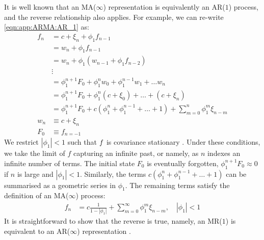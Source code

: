 It is well known that an MA($\infty$) representation is equivalently an AR($1$) process, and the reverse relationship also applies. For example, we can re-write \cref{eqn:app:ARMA:AR_1} as:
\begin{align}
f_n & = c + \xi_n + \phi_1 f_{n-1} \\
& = w_n + \phi_1 f_{n-1} \\
& = w_n + \phi_1 (w_{n-1}+ \phi_1 f_{n-2} ) \\
& \vdots \\
& = \phi_1^{n+1} F_0 + \phi_1^{n} w_{0} + \phi_1^{n-1} w_{1} + \hdots w_n \\
& = \phi_1^{n+1} F_0 + \phi_1^{n} (c + \xi_{0}) + \hdots + (c + \xi_{n}) \\
& = \phi_1^{n+1} F_0 +  c (\phi_1^{n} + \phi_1^{n-1} + \hdots + 1) + \sum_{m=0}^{n} \phi_1^m \xi_{n-m} \\
w_n & \equiv c + \xi_n \\
F_0 & \equiv f_{n=-1} 
\end{align} We restrict $|\phi_1| < 1$ such that $f$ is covariance stationary \cite{hamilton1994time}. %
Under these conditions, we take the limit of $f$ capturing an infinite past, or namely, as $n$ indexes an infinite number of terms. The initial state $F_0$ is eventually forgotten, $\phi_1^{n+1} F_0 \approx 0$ if $n$ is large and $|\phi_1| < 1$. Similarly, the terms $c (\phi_1^{n} + \phi_1^{n-1} + \hdots + 1)$  can be summarised as a geometric series in $\phi_1$. The remaining terms satisfy the definition of an MA($\infty$) process:
\begin{align}
f_n &= c \frac{1}{1 - |\phi_1|}  +  \sum_{m=0}^{\infty} \phi_1^m \xi_{n-m}, \quad |\phi_1| < 1
\end{align}
It is straightforward to show that the reverse is true, namely, an MR($1$) is equivalent to an AR($\infty$) representation \cite{hamilton1994time}.

